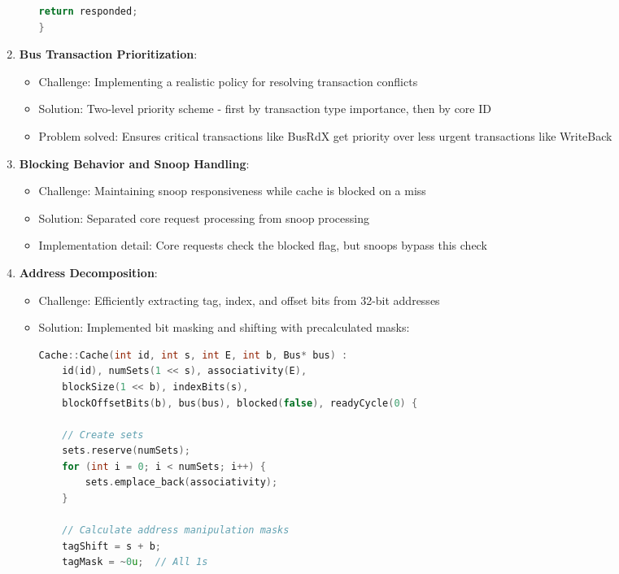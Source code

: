 \documentclass[11pt]{article}
\begin{document}
\begin{enumerate}
\begin{itemize}
\begin{lstlisting}[language=C++]
    return responded;
}
        \end{lstlisting}
    \end{itemize}
    
    \item \textbf{Bus Transaction Prioritization}: 
    \begin{itemize}
        \item Challenge: Implementing a realistic policy for resolving transaction conflicts
        \item Solution: Two-level priority scheme - first by transaction type importance, then by core ID
        \item Problem solved: Ensures critical transactions like BusRdX get priority over less urgent transactions like WriteBack
    \end{itemize}
    
    \item \textbf{Blocking Behavior and Snoop Handling}: 
    \begin{itemize}
        \item Challenge: Maintaining snoop responsiveness while cache is blocked on a miss
        \item Solution: Separated core request processing from snoop processing
        \item Implementation detail: Core requests check the blocked flag, but snoops bypass this check
    \end{itemize}
    
    \item \textbf{Address Decomposition}: 
    \begin{itemize}
        \item Challenge: Efficiently extracting tag, index, and offset bits from 32-bit addresses
        \item Solution: Implemented bit masking and shifting with precalculated masks:
        \begin{lstlisting}[language=C++]
Cache::Cache(int id, int s, int E, int b, Bus* bus) :
    id(id), numSets(1 << s), associativity(E), 
    blockSize(1 << b), indexBits(s),
    blockOffsetBits(b), bus(bus), blocked(false), readyCycle(0) {
    
    // Create sets
    sets.reserve(numSets);
    for (int i = 0; i < numSets; i++) {
        sets.emplace_back(associativity);
    }
    
    // Calculate address manipulation masks
    tagShift = s + b;
    tagMask = ~0u;  // All 1s
    

\end{lstlisting}
\end{itemize}
\end{enumerate}
\end{document}
